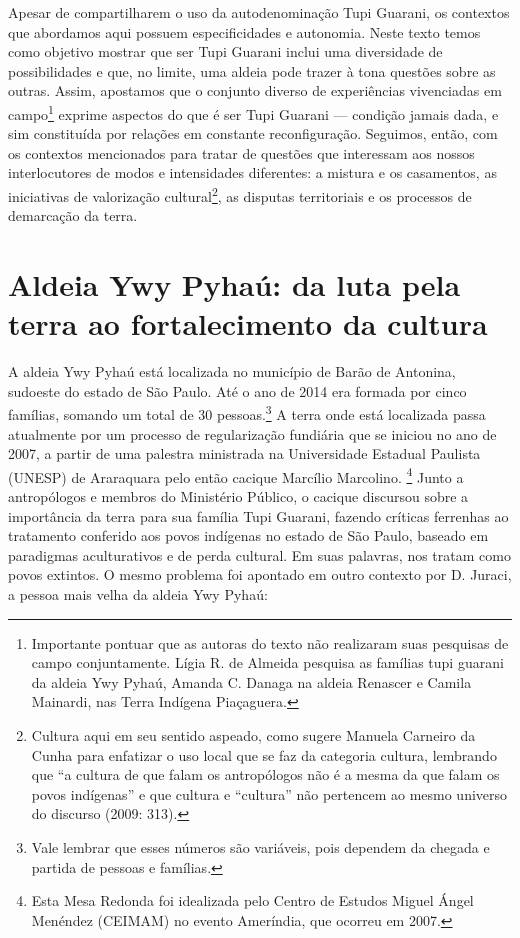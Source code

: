 Apesar de compartilharem o uso da autodenominação Tupi Guarani, os
contextos que abordamos aqui possuem especificidades e autonomia. Neste
texto temos como objetivo mostrar que ser Tupi Guarani inclui uma
diversidade de possibilidades e que, no limite, uma aldeia pode trazer
à tona questões sobre as outras. Assim, apostamos que o conjunto
diverso de experiências vivenciadas em campo\footnote{Importante
pontuar que as autoras do texto não realizaram suas pesquisas de campo
conjuntamente. Lígia R. de Almeida pesquisa as famílias tupi
guarani da aldeia Ywy Pyhaú, Amanda C. Danaga na aldeia Renascer e
Camila Mainardi, nas Terra Indígena Piaçaguera.} exprime aspectos do
que é ser Tupi Guarani — condição jamais dada, e sim constituída por
relações em constante reconfiguração. Seguimos, então, com os contextos
mencionados para tratar de questões que interessam aos nossos
interlocutores de modos e intensidades diferentes: a mistura e os
casamentos, as iniciativas de valorização cultural\footnote{Cultura
aqui em seu sentido aspeado, como sugere Manuela Carneiro da Cunha para
enfatizar o uso local que se faz da categoria cultura, lembrando que ``a
cultura de que falam os antropólogos não é a mesma da que falam os
povos indígenas'' e que cultura e ``cultura'' não pertencem ao mesmo
universo do discurso (2009: 313).}, as disputas territoriais e os
processos de demarcação da terra.  

\section{Aldeia Ywy Pyhaú: da luta pela terra ao fortalecimento da cultura}

A aldeia Ywy Pyhaú está localizada no município de Barão de Antonina,
sudoeste do estado de São Paulo. Até o ano de 2014 era formada por
cinco famílias, somando um total de 30 pessoas.\footnote{Vale lembrar
que esses números são variáveis, pois dependem da chegada e partida de
pessoas e famílias.} A terra onde está localizada passa atualmente por
um processo de regularização fundiária que se iniciou no ano de 2007, a
partir de uma palestra ministrada na Universidade Estadual Paulista
(UNESP) de Araraquara pelo então cacique Marcílio
Marcolino. \footnote{Esta Mesa Redonda foi idealizada pelo Centro de
Estudos Miguel Ángel Menéndez (CEIMAM) no evento Ameríndia, que ocorreu
em 2007.} Junto a antropólogos e membros do Ministério Público, o
cacique discursou sobre a importância da terra para sua família Tupi
Guarani, fazendo críticas ferrenhas ao tratamento conferido aos povos
indígenas no estado de São Paulo, baseado em paradigmas aculturativos e
de perda cultural. Em suas palavras, nos tratam como povos extintos. O
mesmo problema foi apontado em outro contexto por D. Juraci, a pessoa
mais velha da aldeia Ywy Pyhaú:


